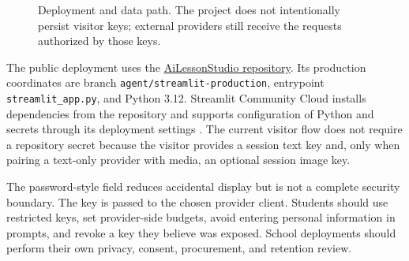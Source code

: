 \documentclass[11pt]{article}
\newcommand{\code}[1]{\texttt{#1}}
\theoremstyle{plain}
\theoremstyle{definition}
\begin{document}
\begin{figure}[H]
\centering
{}
\caption{Deployment and data path. The project does not intentionally persist visitor keys; external providers still receive the requests authorized by those keys.}
\label{fig:deployment}
\end{figure}

The public deployment uses the \href{https://github.com/allanzhang721/AiLessonStudio}{AiLessonStudio repository}. Its production coordinates are branch \texttt{agent/}\allowbreak\texttt{streamlit-production}, entrypoint \texttt{streamlit\_app.py}, and Python 3.12. Streamlit Community Cloud installs dependencies from the repository and supports configuration of Python and secrets through its deployment settings \citep{streamlitDeploy,streamlitSecrets}. The current visitor flow does not require a repository secret because the visitor provides a session text key and, only when pairing a text-only provider with media, an optional session image key.

The password-style field reduces accidental display but is not a complete security boundary. The key is passed to the chosen provider client. Students should use restricted keys, set provider-side budgets, avoid entering personal information in prompts, and revoke a key they believe was exposed. School deployments should perform their own privacy, consent, procurement, and retention review.
\end{document}
